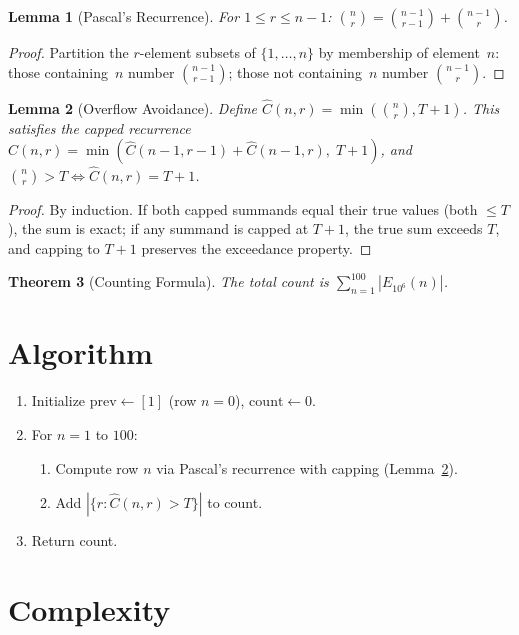 \documentclass[12pt]{article}
\newtheorem{theorem}{Theorem}
\newtheorem{lemma}[theorem]{Lemma}
\theoremstyle{definition}
\begin{document}
\begin{lemma}[Pascal's Recurrence]
For $1 \leq r \leq n - 1$: $\binom{n}{r} = \binom{n-1}{r-1} + \binom{n-1}{r}$.
\end{lemma}

\begin{proof}
Partition the $r$-element subsets of $\{1, \ldots, n\}$ by membership of element~$n$: those containing~$n$ number $\binom{n-1}{r-1}$; those not containing~$n$ number $\binom{n-1}{r}$.
\end{proof}

\begin{lemma}[Overflow Avoidance]
\label{lem:cap}
Define $\hat{C}(n, r) = \min(\binom{n}{r}, T+1)$. This satisfies the capped recurrence $\hat{C}(n, r) = \min(\hat{C}(n-1, r-1) + \hat{C}(n-1, r),\; T+1)$, and $\binom{n}{r} > T \iff \hat{C}(n,r) = T + 1$.
\end{lemma}

\begin{proof}
By induction. If both capped summands equal their true values (both $\leq T$), the sum is exact; if any summand is capped at $T+1$, the true sum exceeds $T$, and capping to $T+1$ preserves the exceedance property.
\end{proof}

\begin{theorem}[Counting Formula]
The total count is $\sum_{n=1}^{100} |E_{10^6}(n)|$.
\end{theorem}

\section{Algorithm}

\begin{enumerate}
    \item Initialize $\mathrm{prev} \gets [1]$ (row $n = 0$), $\mathrm{count} \gets 0$.
    \item For $n = 1$ to $100$:
    \begin{enumerate}
        \item Compute row $n$ via Pascal's recurrence with capping (Lemma~\ref{lem:cap}).
        \item Add $|\{r : \hat{C}(n, r) > T\}|$ to count.
    \end{enumerate}
    \item Return count.
\end{enumerate}

\section{Complexity}
\end{document}
